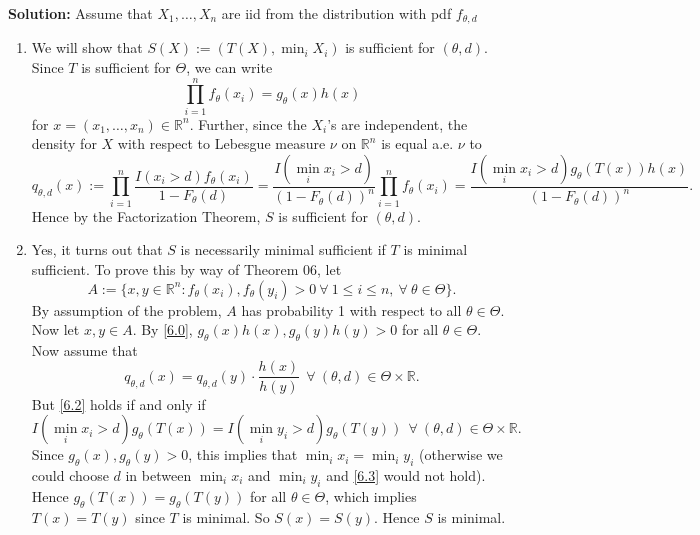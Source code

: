 \documentclass[12pt]{article}
\begin{document}
{\bf Solution:}
Assume that $X_{1}, \dots, X_{n}$ are iid from the distribution with pdf $f_{\theta, d}$
\begin{enumerate}[label=(\alph*)]
  \item We will show that $S(X) := (T(X), \min_{i} X_{i})$ is sufficient for $(\theta, d)$. Since $T$ is sufficient for $\Theta$, we can write
    \begin{equation}
      \prod_{i=1}^{n}f_{\theta}(x_{i}) = g_{\theta}(x)h(x)
      \label{6.0}
    \end{equation}
    for $x = (x_{1}, \dots, x_{n}) \in \mathbb{R}^{n}$. Further,
    since the $X_{i}$'s are independent, the density for $X$
    with respect to Lebesgue measure $\nu$ on $\mathbb{R}^{n}$ is equal a.e. $\nu$ to 
    \begin{equation}
      q_{\theta, d}(x) := \prod_{i=1}^{n}\frac{I(x_{i} > d)f_{\theta}(x_{i})}{1 - F_{\theta}(d)} = \frac{I(\min_{i}x_{i} > d)}{(1 - F_{\theta}(d))^{n}}
    \prod_{i=1}^{n}f_{\theta}(x_{i}) = \frac{I(\min_{i} x_{i} > d)g_{\theta}(T(x))h(x)}{(1 - F_{\theta}(d))^{n}}. 
    \label{6.1}
    \end{equation}
    Hence by the Factorization Theorem, $S$ is sufficient for $(\theta, d)$.

  \item Yes, it turns out that $S$ is necessarily minimal sufficient if $T$ is minimal sufficient. To prove this by way of Theorem 06, let 
    \[
      A := \{x,y \in \mathbb{R}^{n} : f_{\theta}(x_{i}), f_{\theta}(y_{i}) > 0 \ \forall \ 1 \leq i \leq n, \ \forall\ \theta \in \Theta\}.
    \]
    By assumption of the problem, $A$ has probability 1 with respect to all $\theta \in \Theta$.
    Now let $x,y \in A$. By \eqref{6.0}, $g_{\theta}(x)h(x), g_{\theta}(y)h(y) > 0$ for all $\theta \in \Theta$. Now assume that
    \begin{equation}
      q_{\theta,d}(x) = q_{\theta,d}(y)\cdot \frac{h(x)}{h(y)} \ \ \forall \ (\theta, d) \in \Theta \times \mathbb{R}.
      \label{6.2}
    \end{equation}
    But \eqref{6.2} holds if and only if 
    \begin{equation}
      I(\min_{i} x_{i} > d)g_{\theta}(T(x)) = I(\min_{i}y_{i} > d)g_{\theta}(T(y)) \ \ \forall \ (\theta, d) \in \Theta \times \mathbb{R}.
      \label{6.3}
    \end{equation}
    Since $g_{\theta}(x), g_{\theta}(y) > 0$, this implies that $\min_{i} x_{i} = \min_{i}y_{i}$ (otherwise we could choose $d$ in between $\min_{i}
    x_{i}$ and $\min_{i} y_{i}$ and \eqref{6.3} would not hold). Hence $g_{\theta}(T(x)) = g_{\theta}(T(y))$ for all $\theta \in \Theta$, which
    implies $T(x) = T(y)$ since $T$ is minimal. So $S(x) = S(y)$. Hence $S$ is minimal.


\end{enumerate}
\end{document}
